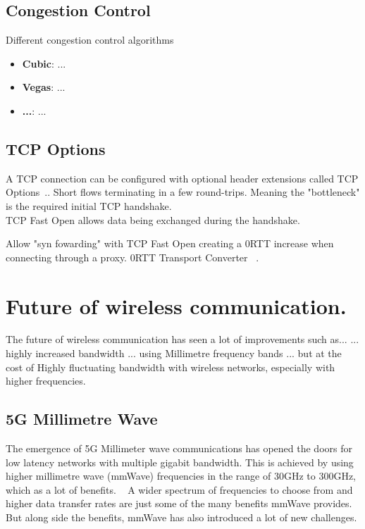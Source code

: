 \documentclass[a4paper,english, 11pt]{report}
\begin{document}
\subsection{Congestion Control}

Different congestion control algorithms
\begin{itemize}
  \item \textbf{Cubic}: ...
  \item \textbf{Vegas}: ...
  \item \textbf{...}: ...
\end{itemize}

\subsection{TCP Options}
A TCP connection can be configured with optional header extensions called TCP Options~\cite{tcp_options}.. 
Short flows terminating in a few round-trips. Meaning the "bottleneck" is the required initial TCP handshake.\\
TCP Fast Open allows data being exchanged during the handshake. 

Allow "syn fowarding" with TCP Fast Open creating a 0RTT increase when connecting through a proxy.
0RTT Transport Converter ~\cite{rfc8803}.


\section{Future of wireless communication.}
The future of wireless communication has seen a lot of improvements such as...
... highly increased bandwidth ... using Millimetre frequency bands ... but at the cost of Highly fluctuating bandwidth with wireless networks, especially with higher frequencies.\\ 

\subsection{5G Millimetre Wave}
The emergence of 5G Millimeter wave communications has opened the doors for low latency networks with multiple gigabit bandwidth. This is achieved by using higher millimetre wave (mmWave) frequencies in the range of 30GHz to 300GHz, which as a lot of benefits. ~\cite{Agrawal_Sharma_2016} A wider spectrum of frequencies to choose from and higher data transfer rates are just some of the many benefits mmWave provides. But along side the benefits, mmWave has also introduced a lot of new challenges.\\
\end{document}
